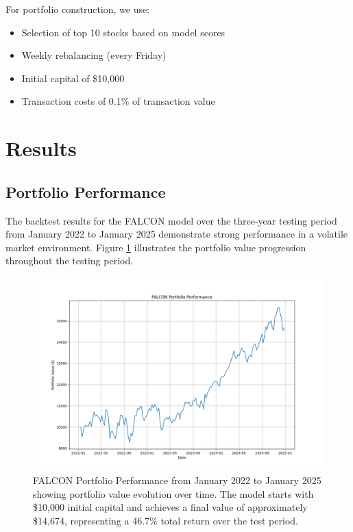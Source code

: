 \documentclass[conference]{IEEEtran}
\begin{document}
For portfolio construction, we use:
\begin{itemize}
\item Selection of top 10 stocks based on model scores
\item Weekly rebalancing (every Friday)
\item Initial capital of \$10,000
\item Transaction costs of 0.1\% of transaction value
\end{itemize}

\section{Results}

\subsection{Portfolio Performance}
The backtest results for the FALCON model over the three-year testing period from January 2022 to January 2025 demonstrate strong performance in a volatile market environment. Figure \ref{fig_performance} illustrates the portfolio value progression throughout the testing period.

\begin{figure}[htbp]
\centerline{\includegraphics[width=\columnwidth]{falcon_performance.png}}
\caption{FALCON Portfolio Performance from January 2022 to January 2025 showing portfolio value evolution over time. The model starts with \$10,000 initial capital and achieves a final value of approximately \$14,674, representing a 46.7\% total return over the test period.}
\label{fig_performance}
\end{figure}
\end{document}
